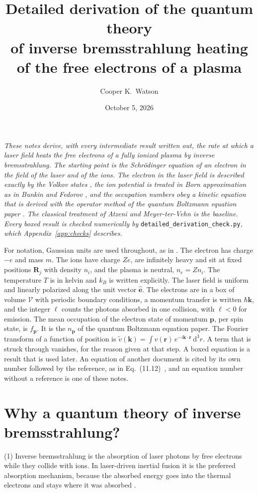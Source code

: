 \documentclass[11pt]{article}
\title{Detailed derivation of the quantum theory\\ of inverse bremsstrahlung heating\\
of the free electrons of a plasma}
\author{Cooper K.\ Watson}
\date{October 5, 2026}
\numberwithin{equation}{section}
\newcommand{\Vol}{\mathcal V}
\newcommand{\ehat}{\hat{\mathbf e}}
\newcommand{\kv}{\mathbf k}
\newcommand{\pv}{\mathbf p}
\newcommand{\rv}{\mathbf r}
\newcommand{\Rv}{\mathbf R}
\newcommand{\dd}{\mathrm d}
\newcommand{\kB}{k_B}
\begin{document}
\maketitle

\noindent\emph{These notes derive, with every intermediate result written
out, the rate at which a laser field heats the free electrons of a fully
ionized plasma by inverse bremsstrahlung. The starting point is the
Schr\"odinger equation of an electron in the field of the laser and of the
ions. The electron in the laser field is described exactly by the Volkov
states \cite{Volkov1935}, the ion potential is treated in Born approximation
as in Bunkin and Fedorov \cite{BunkinFedorov1966}, and the occupation numbers
obey a kinetic equation that is derived with the operator method of the
quantum Boltzmann equation paper \cite{Watson2026}. The classical treatment
of Atzeni and Meyer-ter-Vehn \cite{Atzeni2004} is the baseline. Every boxed
result is checked numerically by} \texttt{detailed\_derivation\_check.py}\emph{,
which Appendix~\ref{app:checks} describes.}

\medskip
\noindent For notation, Gaussian units are used throughout, as in
\cite{Atzeni2004}. The electron has charge $-e$ and mass $m$. The ions have
charge $Ze$, are infinitely heavy and sit at fixed positions $\Rv_j$ with
density $n_i$, and the plasma is neutral, $n_e=Zn_i$. The temperature $T$ is
in kelvin and $\kB$ is written explicitly. The laser field is uniform and
linearly polarized along the unit vector $\ehat$. The electrons are in a box
of volume $\Vol$ with periodic boundary conditions, a momentum transfer is
written $\hbar\kv$, and the integer $\ell$ counts the photons absorbed in one
collision, with $\ell<0$ for emission. The mean occupation of the electron
state of momentum $\pv$, per spin state, is $f_{\pv}$. It is the $n_{\pv}$ of
the quantum Boltzmann equation paper. The Fourier transform of a function of
position is $\tilde v(\kv)=\int v(\rv)\,e^{-i\kv\cdot\rv}\,\dd^3r$. A term
that is struck through vanishes, for the reason given at that step. A boxed
equation is a result that is used later. An equation of another document is
cited by its own number followed by the reference, as in
Eq.~(11.12)~\cite{Atzeni2004}, and an equation number without a reference is
one of these notes.

\tableofcontents


\section{Why a quantum theory of inverse bremsstrahlung?}
\label{sec:why}
{\noindent}(1) Inverse bremsstrahlung is the absorption of laser photons by
free electrons while they collide with ions. In laser-driven inertial fusion it
is the preferred absorption mechanism, because the absorbed energy goes into
the thermal electrons and stays where it was absorbed
\cite[Sec.~11.2]{Atzeni2004}.
\end{document}
